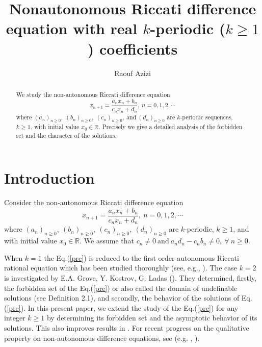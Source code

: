 \documentclass[11pt]{amsart}
\theoremstyle{definition}
\theoremstyle{remark}
\theoremstyle{example}
\numberwithin{equation}{section}
\begin{document}
\title[Global behavior]{Nonautonomous Riccati difference
equation with real $k$-periodic ($k\geq 1$) coefficients }
\author{ Raouf Azizi}
\address{Raouf Azizi, University of Carthage, Faculty of Sciences of
Bizerte, Department of Mathematics, \thinspace\ 7021, Jarzouna. Tunisia.}

\begin{abstract}
We study the non-autonomous Riccati difference equation
\[x_{n+1}=\frac{a_nx_n+b_n}{c_nx_n+d_n}, \ n=0,1,2,\cdots\]
where $(a_n)_{n\geq0}, \ (b_n)_{n\geq0}, \ (c_n)_{n\geq0}, \ \text{and} \ (d_n)_{n\geq0}$ are $k$-periodic sequences, $k\geq 1$, with initial value $x_0 \in  \mathbb{R}$.
Precisely we give a detailed analysis of the forbidden set and the character of the solutions.
\end{abstract}

\maketitle

\section{Introduction}

\vspace{-3mm}
Consider the non-autonomous Riccati difference equation
\begin{equation}
x_{n+1}=\frac{a_nx_n+b_n}{c_nx_n+d_n}, \ n=0,1,2,\cdots \label{pre}
\end{equation}
where $(a_n)_{n\geq0}, \ (b_n)_{n\geq0}, \ (c_n)_{n\geq0}, \ (d_n)_{n\geq0}$ are $k$-periodic, $k\geq 1$, and with initial value $x_0 \in  \mathbb{R}$. We assume that
$c_n\neq0 \ \text{and} \ a_nd_n-c_nb_n\neq0, \ \forall \ n\geq0$.\\
\noindent

When $k=1$ the Eq.(\ref{pre}) is reduced to the first
order autonomous Riccati rational equation which has been studied thoroughly (see, e.g.,  \cite{5,6}).
The case $k=2$ is investigated by E.A. Grove, Y. Kostrov, G. Ladas (\cite{1}).
They determined, firstly, the forbidden set of the Eq.(\ref{pre}) or also called the domain of undefinable solutions
(see Definition 2.1), and secondly, the behavior of the solutions of Eq.(\ref{pre}).
In this present paper, we extend the study of the Eq.(\ref{pre}) for any integer $k\geq1$
by determining its forbidden set and the
asymptotic behavior of its solutions. This also improves results in \cite{1, 8}.
For recent progress on the qualitative property on non-autonomous difference equations, see (e.g. , \cite{2,9,8,10,1,5,11}).
\vspace{0.1mm}\\
\noindent
\end{document}
